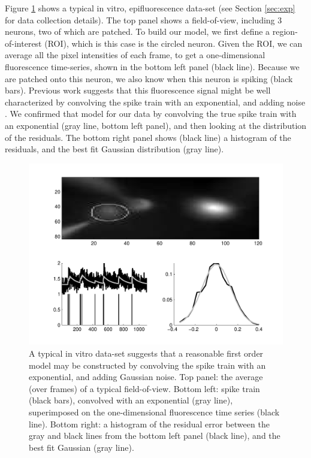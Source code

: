 Figure \ref{fig:in_vitro_ex} shows a typical in vitro, epifluorescence data-set (see Section \ref{sec:exp} for data collection details).  The top panel shows a field-of-view, including 3 neurons, two of which are patched.  To build our model, we first define a region-of-interest (ROI),  which is this case is the circled neuron.  Given the ROI, we can average all the pixel intensities of each frame, to get a one-dimensional fluorescence time-series, shown in the bottom left panel (black line).  Because we are patched onto this neuron, we also know when this neuron is spiking (black bars). 
Previous work suggests that this fluorescence signal might be well characterized by convolving the spike train with an exponential, and adding noise \cite{ImagingManual}.  We confirmed that model for our data by convolving the true spike train with an exponential (gray line, bottom left panel), and then looking at the distribution of the residuals.  The bottom right panel shows (black line) a histogram of the residuals, and the best fit Gaussian distribution (gray line).


\begin{figure}[h!]
\centering \includegraphics[width=.9\linewidth]{../figs/in_vitro_ex}
\caption{A typical in vitro data-set suggests that a reasonable first order model may be constructed by convolving the spike train with an exponential, and adding Gaussian noise. Top panel: the average (over frames) of a typical field-of-view.  Bottom left: spike train (black bars), convolved with an exponential (gray line), superimposed on the one-dimensional fluorescence time series (black line).  Bottom right: a histogram of the residual error between the gray and black lines from the bottom left panel (black line), and the best fit Gaussian (gray line).} \label{fig:in_vitro_ex}
\end{figure}

